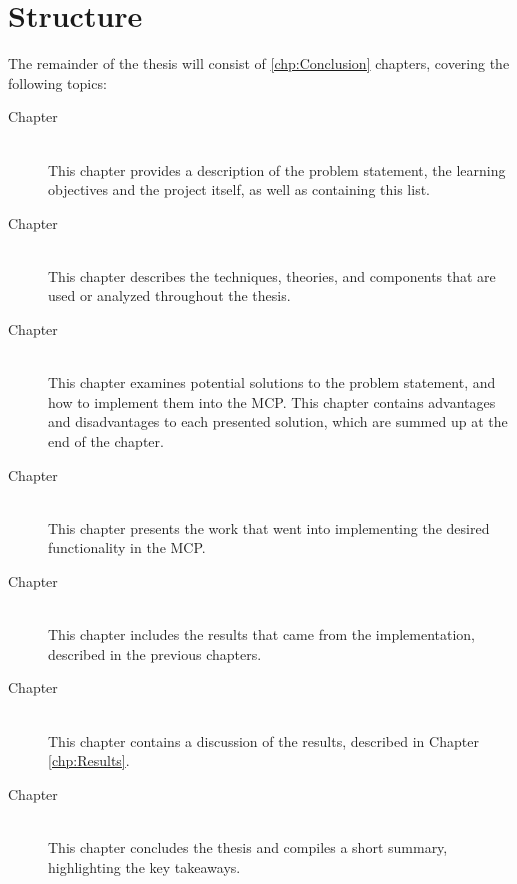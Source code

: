 \section{Structure}
The remainder of the thesis will consist of \ref{chp:Conclusion} chapters, covering the following topics:
\begin{description}
	\item[Chapter ]\ \\
	This chapter provides a description of the problem statement, the learning objectives and the project itself, as well as containing this list.
	\item[Chapter ]\ \\
	This chapter describes the techniques, theories, and components that are used or analyzed throughout the thesis.
	\item[Chapter ]\ \\
	This chapter examines potential solutions to the problem statement, and how to implement them into the MCP. This chapter contains advantages and disadvantages to each presented solution, which are summed up at the end of the chapter.
	\item[Chapter ]\ \\
	This chapter presents the work that went into implementing the desired functionality in the MCP.
	\item[Chapter ]\ \\
	This chapter includes the results that came from the implementation, described in the previous chapters.
	\item[Chapter ]\ \\
	This chapter contains a discussion of the results, described in Chapter \ref{chp:Results}.
	\item[Chapter ]\ \\
	This chapter concludes the thesis and compiles a short summary, highlighting the key takeaways.
\end{description}